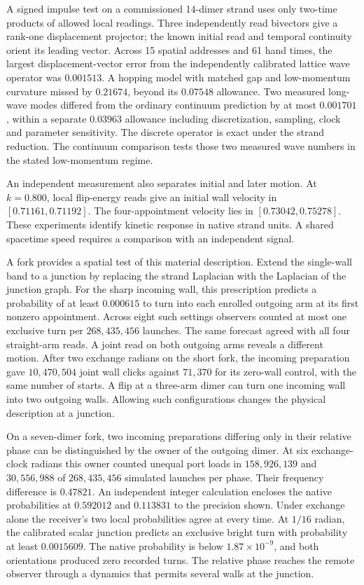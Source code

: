\documentclass[11pt]{article}
\theoremstyle{definition}
\theoremstyle{remark}
\theoremstyle{plain}
\begin{document}
A signed impulse test on a commissioned 14-dimer strand uses only
two-time products of allowed local readings. Three independently read
bivectors give a rank-one displacement projector; the known initial read
and temporal continuity orient its leading vector. Across 15 spatial
addresses and 61 hand times, the largest displacement-vector error from
the independently calibrated lattice wave operator was $0.001513$.
A hopping model with matched gap and low-momentum curvature missed by
$0.21674$, beyond its $0.07548$ allowance. Two measured long-wave modes
differed from the ordinary continuum prediction by at most $0.001701$,
within a separate $0.03963$ allowance including discretization, sampling,
clock and parameter sensitivity. The discrete operator is exact under
the strand reduction. The continuum comparison tests those two measured
wave numbers in the stated low-momentum regime.

An independent measurement also separates initial and later
motion. At \(k=0.800\), local flip-energy reads give an initial wall
velocity in \([0.71161,0.71192]\). The four-appointment velocity lies
in \([0.73042,0.75278]\). These experiments identify kinetic response
in native strand units. A shared spacetime speed requires a comparison
with an independent signal.

A fork provides a spatial test of this material description. Extend the
single-wall band to a junction by replacing the strand Laplacian with
the Laplacian of the junction graph. For the sharp incoming wall, this
prescription predicts a probability of at least \(0.000615\) to turn
into each enrolled outgoing arm at its first nonzero appointment.
Across eight such settings observers counted at most one exclusive turn
per \(268{,}435{,}456\) launches. The same forecast agreed with all four
straight-arm reads. A joint read on both outgoing arms reveals a
different motion. After two exchange radians on the short fork, the
incoming preparation gave \(10{,}470{,}504\) joint wall clicks against
\(71{,}370\) for its zero-wall control, with the same number of starts.
A flip at a three-arm dimer can turn one incoming wall into two outgoing
walls. Allowing such configurations changes the physical description
at a junction.

On a seven-dimer fork, two incoming preparations differing only in their
relative phase can be distinguished by the owner of the outgoing dimer.
At six exchange-clock radians this owner counted unequal port loads in
$158{,}926{,}139$ and $30{,}556{,}988$ of $268{,}435{,}456$ simulated
launches per phase. Their frequency difference is $0.47821$. An independent
integer calculation encloses the native probabilities at $0.592012$ and
$0.113831$ to the precision shown. Under exchange alone the receiver's
two local probabilities agree at every time. At $1/16$ radian, the
calibrated scalar junction predicts an exclusive bright turn with
probability at least $0.0015609$. The native probability is below
$1.87\times10^{-9}$, and both orientations produced zero recorded turns.
The relative phase reaches the remote observer through a dynamics that
permits several walls at the junction.
\end{document}
